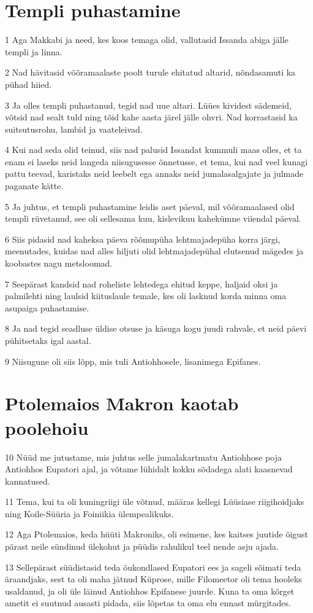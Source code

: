 \section*{Templi puhastamine}

\par 1 Aga Makkabi ja need, kes koos temaga olid, vallutasid Issanda abiga jälle templi ja linna.
\par 2 Nad hävitasid võõramaalaste poolt turule ehitatud altarid, nõndasamuti ka pühad hiied.
\par 3 Ja olles templi puhastanud, tegid nad uue altari. Lüües kividest sädemeid, võtsid nad sealt tuld ning tõid kahe aasta järel jälle ohvri. Nad korrastasid ka suitsutusrohu, lambid ja vaateleivad.
\par 4 Kui nad seda olid teinud, siis nad palusid Issandat kummuli maas olles, et ta enam ei laseks neid langeda niisugusesse õnnetusse, et tema, kui nad veel kunagi pattu teevad, karistaks neid leebelt ega annaks neid jumalasalgajate ja julmade paganate kätte.
\par 5 Ja juhtus, et templi puhastamine leidis aset päeval, mil võõramaalased olid templi rüvetanud, see oli sellesama kuu, kislevikuu kahekümne viiendal päeval.
\par 6 Siis pidasid nad kaheksa päeva rõõmupüha lehtmajadepüha korra järgi, meenutades, kuidas nad alles hiljuti olid lehtmajadepühal elutsenud mägedes ja koobastes nagu metsloomad.
\par 7 Seepärast kandsid nad roheliste lehtedega ehitud keppe, haljaid oksi ja palmilehti ning laulsid kiituslaule temale, kes oli lasknud korda minna oma asupaiga puhastamise.
\par 8 Ja nad tegid seadluse üldise otsuse ja käsuga kogu juudi rahvale, et neid päevi pühitsetaks igal aastal.
\par 9 Niisugune oli siis lõpp, mis tuli Antiohhosele, lisanimega Epifanes.


\section*{Ptolemaios Makron kaotab poolehoiu}

\par 10 Nüüd me jutustame, mis juhtus selle jumalakartmatu Antiohhose poja Antiohhos Eupatori ajal, ja võtame lühidalt kokku sõdadega alati kaasnevad kannatused.
\par 11 Tema, kui ta oli kuningriigi üle võtnud, määras kellegi Lüüsiase riigihoidjaks ning Koile-Süüria ja Foiniikia ülempealikuks.
\par 12 Aga Ptolemaios, keda hüüti Makroniks, oli esimene, kes kaitses juutide õigust pärast neile sündinud ülekohut ja püüdis rahulikul teel nende asju ajada.
\par 13 Sellepärast süüdistasid teda õukondlased Eupatori ees ja sageli sõimati teda äraandjaks, sest ta oli maha jätnud Küprose, mille Filomeetor oli tema hooleks usaldanud, ja oli üle läinud Antiohhos Epifanese juurde. Kuna ta oma kõrget ametit ei suutnud ausasti pidada, siis lõpetas ta oma elu ennast mürgitades.


